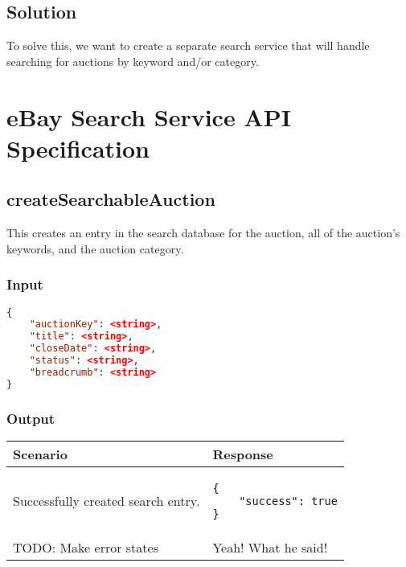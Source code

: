 \documentclass[12pt,a4paper]{article}
\begin{document}
\subsection{Solution}

To solve this, we want to create a separate search service that will handle
searching for auctions by keyword and/or category.



\section{eBay Search Service API Specification}

\subsection{createSearchableAuction}
This creates an entry in the search database for the auction, all of the
auction's keywords, and the auction category.

\subsubsection{Input}
\begin{lstlisting}[language=json,firstnumber=1]
{
    "auctionKey": <string>,
    "title": <string>,
    "closeDate": <string>,
    "status": <string>,
    "breadcrumb": <string>
}
\end{lstlisting}

\subsubsection{Output}
\begin{center}
    \begin{tabular}{| p{5cm} | l |}
        \hline
        \textbf{Scenario} & \textbf{Response} \\
        \hline
        Successfully created search entry. & 
        \begin{lstlisting}[boxpos=t,language=tableJson,firstnumber=1]
{
    "success": true
}
        \end{lstlisting} \\ 
        \hline
            TODO: Make error states & Yeah! What he said! \\
        \hline
    \end{tabular}
\end{center}
\end{document}
